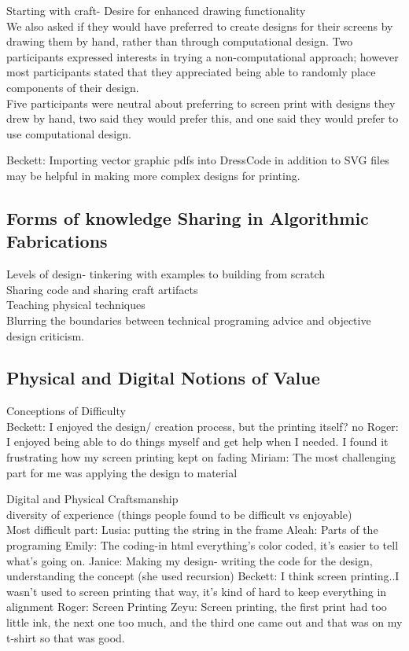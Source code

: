 \documentclass{sigchi}
\begin{document}
Starting with craft- Desire for enhanced drawing functionality\\
We also asked if they would have preferred to create designs for their screens by drawing them by hand, rather than through computational design. Two participants expressed interests in trying a non-computational approach; however most participants stated that they appreciated being able to randomly place components of their design.\\
Five participants were neutral about preferring to screen print with designs they drew by hand, two said they would prefer this, and one said they would prefer to use computational design. 

Beckett:  Importing vector graphic pdfs into DressCode in addition to SVG files may be helpful in making more complex designs for printing. 


\subsection{Forms of knowledge Sharing in Algorithmic Fabrications}
Levels of design- tinkering with examples to building from scratch\\
Sharing code and sharing craft artifacts\\
Teaching physical techniques\\
Blurring the boundaries between technical programing advice and objective design criticism.

\subsection{Physical and Digital Notions of Value}
Conceptions of Difficulty\\
Beckett: I enjoyed the design/ creation process, but the printing itself? no
Roger: I enjoyed being able to do things myself and get help when I needed. I found it frustrating how my screen printing kept on fading
Miriam: The most challenging part for me was applying the design to material

Digital and Physical Craftsmanship\\
diversity of experience (things people found to be difficult vs enjoyable)\\
Most difficult part:
Lusia: putting the string in the frame
Aleah: Parts of the programing
Emily: The coding-in html everything's color coded, it's easier to tell what's going on.
Janice: Making my design- writing the code for the design, understanding the concept (she used recursion)
Beckett: I think screen printing..I wasn't used to screen printing that way, it's kind of hard to keep everything in alignment
Roger: Screen Printing
Zeyu: Screen printing, the first print had too little ink, the next one too much, and the third one came out and that was on my t-shirt so that was good.
\end{document}

